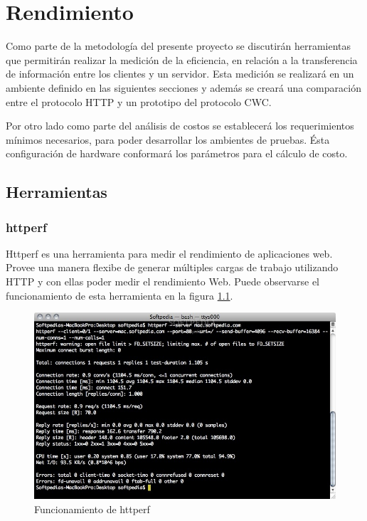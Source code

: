 
\chapter{Rendimiento} %

\label{ch:rendimiento} %

Como parte de la metodología del presente proyecto se discutirán herramientas que permitirán realizar la medición de la eficiencia, en relación a la transferencia de información entre los clientes y un servidor. Esta medición se realizará en un ambiente definido en las siguientes secciones y además se creará una comparación entre el protocolo HTTP y un prototipo del protocolo CWC. 

Por otro lado como parte del análisis de costos se establecerá los requerimientos mínimos necesarios, para poder desarrollar los ambientes de pruebas. Ésta configuración de hardware conformará los parámetros para el cálculo de costo. 


\section{Herramientas}


\subsection{httperf}

Httperf es una herramienta para medir el rendimiento de aplicaciones web. Provee una manera flexibe de generar múltiples cargas de trabajo utilizando HTTP y con ellas poder medir el rendimiento Web. Puede observarse el funcionamiento de esta herramienta en la figura \ref{httperf}.

\begin{figure}[h]
  \centering
    \includegraphics[scale=0.4]{gfx/httperf}
  \caption{Funcionamiento de httperf}
  \label{httperf}
\end{figure}

